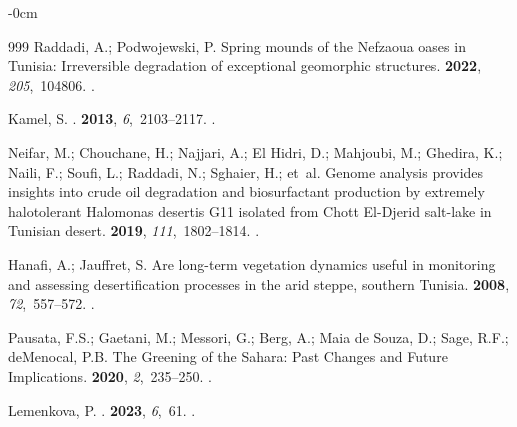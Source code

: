 \documentclass[land,article,accept,pdftex,moreauthors]{Definitions/mdpi}
\begin{document}
\begin{adjustwidth}{-\extralength}{0cm}
\begin{thebibliography}{999}
Raddadi, A.; Podwojewski, P.
\newblock Spring mounds of the Nefzaoua oases in Tunisia: Irreversible
  degradation of exceptional geomorphic structures.
 {\bf 2022}, {\em 205},~104806.
.

Kamel, S.
.
 {\bf 2013}, {\em 6},~2103--2117.
.

Neifar, M.; Chouchane, H.; Najjari, A.; {El Hidri}, D.; Mahjoubi, M.; Ghedira,
  K.; Naili, F.; Soufi, L.; Raddadi, N.; Sghaier, H.;  et~al.
\newblock Genome analysis provides insights into crude oil degradation and
  biosurfactant production by extremely halotolerant Halomonas desertis G11
  isolated from Chott El-Djerid salt-lake in Tunisian desert.
 {\bf 2019}, {\em 111},~1802--1814.
.

Hanafi, A.; Jauffret, S.
\newblock Are long-term vegetation dynamics useful in monitoring and assessing
  desertification processes in the arid steppe, southern Tunisia.
 {\bf 2008}, {\em 72},~557--572.
.

Pausata, F.S.; Gaetani, M.; Messori, G.; Berg, A.; {Maia de Souza}, D.; Sage,
  R.F.; deMenocal, P.B.
\newblock The Greening of the Sahara: Past Changes and Future Implications.
 {\bf 2020}, {\em 2},~235--250.
.

Lemenkova, P.
.
 {\bf 2023}, {\em 6},~61.
.


\end{thebibliography}
\end{adjustwidth}
\end{document}
